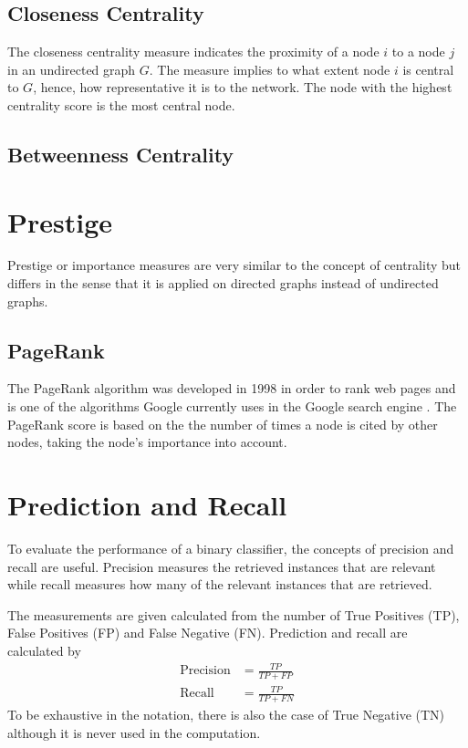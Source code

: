 \subsection{Closeness Centrality}
The closeness centrality measure indicates the proximity of a node $i$ to a node $j$ in an undirected graph $G$. The measure implies to what extent node $i$ is central to $G$, hence, how representative it is to the network. The node with the highest centrality score is the most central node.



\subsection{Betweenness Centrality}




\section{Prestige}
Prestige or importance measures are very similar to the concept of centrality but differs in the sense that it is applied on directed graphs instead of undirected graphs. 


\subsection{PageRank}
The PageRank algorithm was developed in 1998 in order to rank web pages and is one of the algorithms Google currently uses in the Google search engine \cite{langville2004deeperinside,langville2012}. The PageRank score is based on the the number of times a node is cited by other nodes, taking the node's importance into account. 


\section{Prediction and Recall}
To evaluate the performance of a binary classifier, the concepts of precision and recall are useful. Precision measures the retrieved instances that are relevant while recall measures how many of the relevant instances that are retrieved.

The measurements are given calculated from the number of True Positives (TP), False Positives (FP) and False Negative (FN). Prediction and recall are calculated by 
\begin{align}
\text{Precision}&=\frac{TP}{TP+FP}\\
\text{Recall}&=\frac{TP}{TP+FN}
\end{align}
To be exhaustive in the notation, there is also the case of True Negative (TN) although it is never used in the computation.


